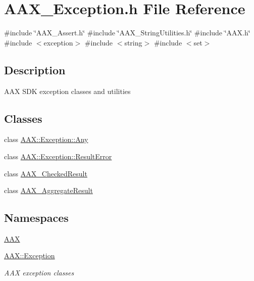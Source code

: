\hypertarget{a00497}{}\section{A\+A\+X\+\_\+\+Exception.\+h File Reference}
\label{a00497}
{\ttfamily \#include \char`\"{}A\+A\+X\+\_\+\+Assert.\+h\char`\"{}}\newline
{\ttfamily \#include \char`\"{}A\+A\+X\+\_\+\+String\+Utilities.\+h\char`\"{}}\newline
{\ttfamily \#include \char`\"{}A\+A\+X.\+h\char`\"{}}\newline
{\ttfamily \#include $<$exception$>$}\newline
{\ttfamily \#include $<$string$>$}\newline
{\ttfamily \#include $<$set$>$}\newline


\subsection{Description}
A\+AX S\+DK exception classes and utilities 

\subsection*{Classes}
\begin{DoxyCompactItemize}
\item 
class \mbox{\hyperlink{a01593}{A\+A\+X\+::\+Exception\+::\+Any}}
\item 
class \mbox{\hyperlink{a01597}{A\+A\+X\+::\+Exception\+::\+Result\+Error}}
\item 
class \mbox{\hyperlink{a01601}{A\+A\+X\+\_\+\+Checked\+Result}}
\item 
class \mbox{\hyperlink{a01605}{A\+A\+X\+\_\+\+Aggregate\+Result}}
\end{DoxyCompactItemize}
\subsection*{Namespaces}
\begin{DoxyCompactItemize}
\item 
 \mbox{\hyperlink{a00852}{A\+AX}}
\item 
 \mbox{\hyperlink{a00853}{A\+A\+X\+::\+Exception}}
\begin{DoxyCompactList}\small\item\em A\+AX exception classes \end{DoxyCompactList}\end{DoxyCompactItemize}
